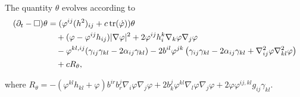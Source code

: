\documentclass{amsart}
\begin{document}
\begin{lemma}
\label{lem:Evtheta}
The quantity $\theta$ evolves according to
\[
\begin{split}
(\partial_{t} - \Box)\theta &= (\varphi^{ij}(h^2)_{ij} + c\operatorname{tr}(\dot{\varphi}))\theta \\
&\quad + (\varphi - \varphi^{ij}h_{ij})|\nabla\varphi|^{2} + 2\varphi^{ij}h^{k}_{i}\nabla_k\varphi\nabla_j\varphi \\
&\quad - \varphi^{kl,ij} (\gamma_{ij}\gamma_{kl}  - 2\alpha_{ij} \gamma_{kl}) - 2b^{il} \varphi^{jk} \left(\gamma_{ij} \gamma_{kl} - 2\alpha_{ij} \gamma_{kl} + \nabla^2_{ij}\varphi\nabla^2_{kl}\varphi\right) \\
&\quad + cR_{\theta},
\end{split}
\]
\end{lemma}
where
$
R_{\theta} = -(\varphi^{kl}h_{kl} + \varphi)b^{ir}b^{j}_{r}\nabla_i \varphi\nabla_j\varphi + 2 b^{j}_{k}\varphi^{kl}\nabla_l\varphi\nabla_j\varphi + 2 \varphi\varphi^{ij,kl} g_{ij} \gamma_{kl}.
$
\end{document}
